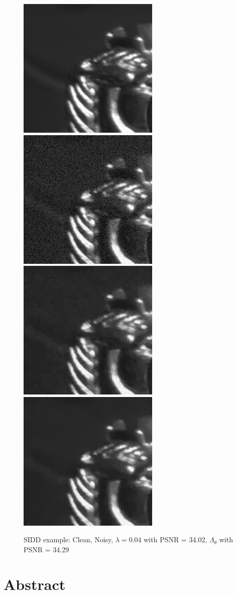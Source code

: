 \documentclass[12pt]{article}
\begin{document}
\begin{figure}[h]
    \centering
    \includegraphics[width=0.34\linewidth]{100-clean.png}
    \includegraphics[width=0.34\linewidth]{100-noisy-mse.png}
    \includegraphics[width=0.34\linewidth]{100-psnr_34.02-lambda_0.04.png}
    \includegraphics[width=0.34\linewidth]{100-denoised-mse_24.42-psnr_34.29-ssim_0.96.png}
    \caption{SIDD example: Clean, Noisy, $\lambda = 0.04$ with PSNR = 34.02, $\Lambda_\theta$ with PSNR = 34.29}
    \label{fig:enter-label}
\end{figure}

\section{Abstract}
\end{document}
